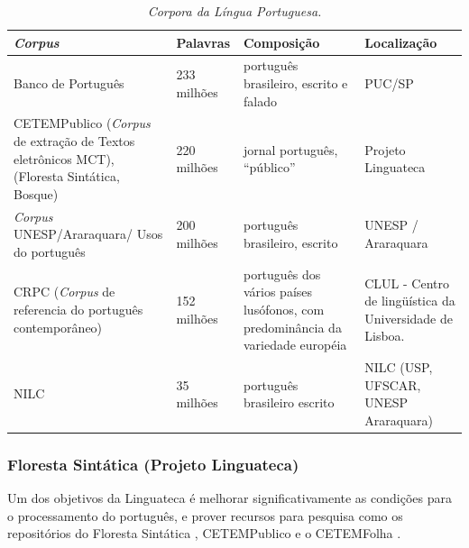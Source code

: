 \begin{table}
   \centering
   \small
   \caption{\it Corpora da Língua Portuguesa.}

    \begin{tabular}{ | p{5cm} | p{3cm} | p{3cm} | p{3cm} | }
      \hline
        \textbf{\emph{Corpus}} & \textbf{Palavras} & \textbf{Composição}& \textbf{Localização}\\
        \hline
        \hline

        Banco de Português &  233 milhões & português brasileiro, escrito e falado & PUC/SP \\

        \hline

        CETEMPublico (\emph{Corpus} de extração de Textos eletrônicos MCT), (Floresta Sintática, Bosque) & 220 milhões & jornal português, ``público'' & Projeto Linguateca \\

        \hline

        \emph{Corpus} UNESP/Araraquara/ Usos do português & 200 milhões & português brasileiro, escrito & UNESP / Araraquara \\

        \hline

        CRPC (\emph{Corpus} de referencia do português contemporâneo) & 152 milhões & português dos vários países lusófonos, com predominância da variedade européia & CLUL - Centro de lingüística da Universidade de Lisboa. \\

        \hline

        NILC & 35 milhões & português brasileiro escrito & NILC (USP, UFSCAR, UNESP Araraquara) \\
    \hline

   \end{tabular}
   \label{tbl:corpora_port}
\end{table}

\subsubsection{Floresta Sintática (Projeto Linguateca)}
\label{sub:sub_linguateca}

Um dos objetivos da Linguateca é melhorar significativamente as condições para o processamento do português, e prover recursos para pesquisa como os repositórios do Floresta Sintática , CETEMPublico e o CETEMFolha .

